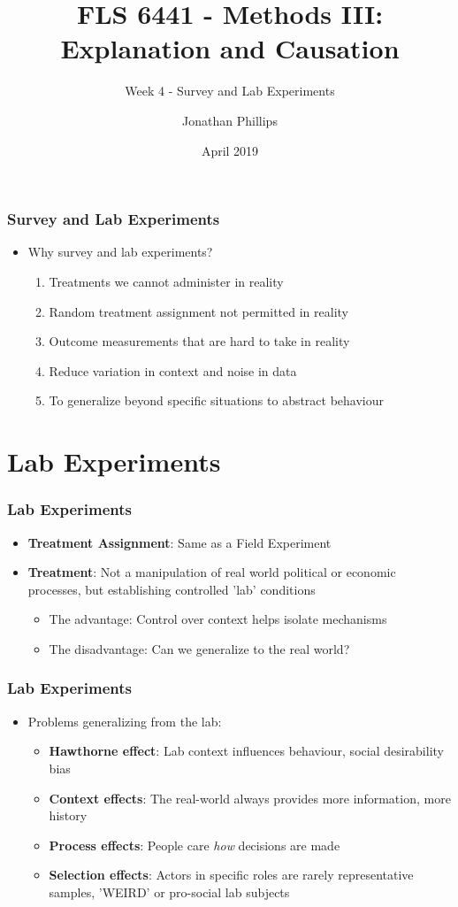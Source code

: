\documentclass[xcolor=x11names,compress]{beamer}\usepackage[]{graphicx}\usepackage[]{color}
\title{FLS 6441 - Methods III: Explanation and Causation}
\subtitle{Week 4 - Survey and Lab Experiments}
\author{Jonathan Phillips}
\date{April 2019}
\renewcommand{\(}{\begin{columns}}
\renewcommand{\)}{\end{columns}}
\newcommand{\<}[1]{\begin{column}{#1}}
\renewcommand{\>}{\end{column}}
\begin{document}
\frame{\titlepage}

\begin{frame}
\frametitle{Survey and Lab Experiments}
\begin{itemize}
\item Why survey and lab experiments?
\pause
\begin{enumerate}
\item Treatments we cannot administer in reality
\pause
\item Random treatment assignment not permitted in reality
\pause
\item Outcome measurements that are hard to take in reality
\pause
\item Reduce variation in context and noise in data
\pause
\item To generalize beyond specific situations to abstract behaviour
\end{enumerate}
\end{itemize}
\end{frame}

\section{Lab Experiments}

\begin{frame}
\frametitle{Lab Experiments}
\begin{itemize}
\item \textbf{Treatment Assignment}: Same as a Field Experiment
\pause
\item \textbf{Treatment}: Not a manipulation of real world political or economic processes, but establishing controlled 'lab' conditions
\pause
\begin{itemize}
\item The advantage: Control over context helps isolate mechanisms
\pause
\item The disadvantage: Can we generalize to the real world?
\end{itemize}
\end{itemize}
\end{frame}

\begin{frame}
\frametitle{Lab Experiments}
\begin{itemize}
\item Problems generalizing from the lab:
\pause
\begin{itemize}
\item \textbf{Hawthorne effect}: Lab context influences behaviour, social desirability bias
\pause
\item \textbf{Context effects}: The real-world always provides more information, more history
\pause
\item \textbf{Process effects}: People care \textit{how} decisions are made
\item \textbf{Selection effects}: Actors in specific roles are rarely representative samples, 'WEIRD' or pro-social lab subjects
\end{itemize}
\end{itemize}
\end{frame}
\end{document}
